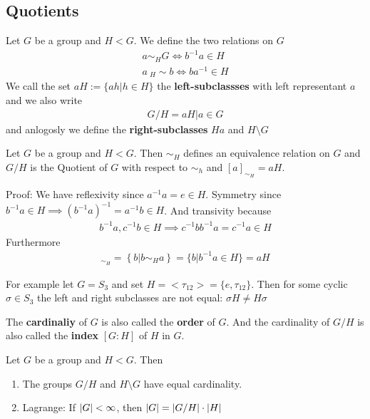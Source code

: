 \subsection{Quotients}

\begin{definition}[]
	Let $G$ be a group and $H < G$. We define the two relations on $G$
	\begin{align*}
		a \sim_H G \iff b^{-1}a \in H\\
		a\  _H\sim b \iff ba^{-1} \in H
	\end{align*}
	We call the set $aH := \{ah \big\vert h \in H\}$ the \textbf{left-subclassses} with left representant $a$ and we also write
	\begin{align*}
		G/H = {aH \big\vert a \in G}	
	\end{align*}
	and anlogosly we define the \textbf{right-subclasses} $Ha$ and $H \setminus G$
\end{definition}

\begin{lemma}[]
	Let $G$ be a group and $H < G$. Then $\sim_H$ defines an equivalence relation on $G$ and $G/H$ is the Quotient of $G$ with respect to $\sim_h$ and $[a]_{\sim_H} = aH$.
\end{lemma}

Proof: We have reflexivity since $a^{-1}a = e \in H$. Symmetry since $b^{-1}a \in H \implies \left(b^{-1}a\right)^{-1} = a^{-1}b \in H$. And transivity because
\begin{align*}
	b^{-1}a, c^{-1}b \in H \implies c^{-1}bb^{-1}a = c^{-1}a \in H
\end{align*}
Furthermore
\begin{align*}
	[a]_{\sim_H} = \left\{b \big\vert b \sim_H a\right\} = \{b \big\vert b^{-1}a \in H\} = aH
\end{align*}

For example let $G = S_3$ and set $H = <\tau_{12}> = \{e, \tau_{12}\}$. Then for some cyclic $\sigma \in S_3$ the left and right subclasses are not equal: $\sigma H \neq H \sigma$

\begin{definition}[]
	The \textbf{cardinaliy} of $G$ is also called the \textbf{order} of $G$. And the cardinality of $G/H$ is also called the \textbf{index} $[G:H]$ of $H$ in $G$.
\end{definition}
\begin{theorem}[]
Let $G$ be a group and $H < G$. Then
\begin{enumerate}
	\item The groups $G/H$ and $H \setminus G$ have equal cardinality.
	\item Lagrange: If $\vert G\vert < \infty$, then $\vert G\vert = \vert G/H\vert \cdot \vert H\vert$
\end{enumerate}
\end{theorem}

